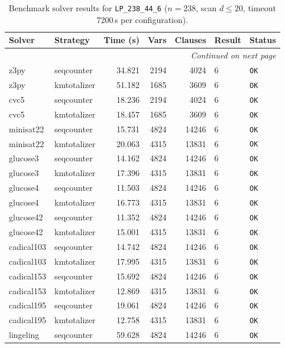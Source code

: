 \begin{longtable}{llrrrl p{}}
\caption{Benchmark solver results for \texttt{LP\_238\_44\_6} ($n=238$, scan $d \leq 20$, timeout 7200\,s per configuration).} \label{tab:bench-LP_238_44_6} \\
\toprule
Solver & Strategy & Time (s) & Vars & Clauses & Result & Status \\
\midrule
\endhead
\midrule
\multicolumn{7}{r}{\textit{Continued on next page}} \\
\midrule
\endfoot
\bottomrule
\endlastfoot
z3py & seqcounter & 34.821 & 2194 & 4024 & 6 & \texttt{OK} \\
z3py & kmtotalizer & 51.182 & 1685 & 3609 & 6 & \texttt{OK} \\
cvc5 & seqcounter & 18.236 & 2194 & 4024 & 6 & \texttt{OK} \\
cvc5 & kmtotalizer & 18.457 & 1685 & 3609 & 6 & \texttt{OK} \\
minisat22 & seqcounter & 15.731 & 4824 & 14246 & 6 & \texttt{OK} \\
minisat22 & kmtotalizer & 20.063 & 4315 & 13831 & 6 & \texttt{OK} \\
glucose3 & seqcounter & 14.162 & 4824 & 14246 & 6 & \texttt{OK} \\
glucose3 & kmtotalizer & 17.396 & 4315 & 13831 & 6 & \texttt{OK} \\
glucose4 & seqcounter & 11.503 & 4824 & 14246 & 6 & \texttt{OK} \\
glucose4 & kmtotalizer & 16.773 & 4315 & 13831 & 6 & \texttt{OK} \\
glucose42 & seqcounter & 11.352 & 4824 & 14246 & 6 & \texttt{OK} \\
glucose42 & kmtotalizer & 15.001 & 4315 & 13831 & 6 & \texttt{OK} \\
cadical103 & seqcounter & 14.742 & 4824 & 14246 & 6 & \texttt{OK} \\
cadical103 & kmtotalizer & 17.995 & 4315 & 13831 & 6 & \texttt{OK} \\
cadical153 & seqcounter & 15.692 & 4824 & 14246 & 6 & \texttt{OK} \\
cadical153 & kmtotalizer & 12.869 & 4315 & 13831 & 6 & \texttt{OK} \\
cadical195 & seqcounter & 19.061 & 4824 & 14246 & 6 & \texttt{OK} \\
cadical195 & kmtotalizer & 12.758 & 4315 & 13831 & 6 & \texttt{OK} \\
lingeling & seqcounter & 59.628 & 4824 & 14246 & 6 & \texttt{OK} \\

\end{longtable}

